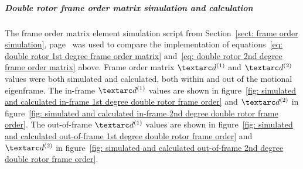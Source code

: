\subparagraph[Frame order matrix simulation and calculation]{Double rotor frame order matrix simulation and calculation}

The frame order matrix element simulation script from Section~\ref{sect: frame order simulation}, page~\pageref{sect: frame order simulation} was used to compare the implementation of equations~\ref{eq: double rotor 1st degree frame order matrix} and~\ref{eq: double rotor 2nd degree frame order matrix} above.
Frame order matrix $\FOone$ and $\FOtwo$ values were both simulated and calculated, both within and out of the motional eigenframe.
The in-frame $\FOone$ values are shown in figure~\ref{fig: simulated and calculated in-frame 1st degree double rotor frame order} and $\FOtwo$ in figure~\ref{fig: simulated and calculated in-frame 2nd degree double rotor frame order}.
The out-of-frame $\FOone$ values are shown in figure~\ref{fig: simulated and calculated out-of-frame 1st degree double rotor frame order} and $\FOtwo$ in figure~\ref{fig: simulated and calculated out-of-frame 2nd degree double rotor frame order}.
